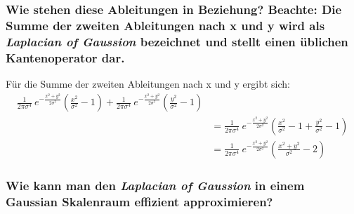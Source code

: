 \subsubsection*{Wie stehen diese Ableitungen in Beziehung? Beachte: Die Summe der zweiten Ableitungen nach x und y wird als \emph{Laplacian of Gaussion} bezeichnet und stellt einen \"ublichen Kantenoperator dar.}
F\"ur die Summe der zweiten Ableitungen nach x und y ergibt sich:
\begin{align*}
\frac{1}{2 \pi \sigma^4}~e^{-\frac{x^2 + y^2}{2 \sigma^2}} (\frac{x^2}{\sigma^2} - 1) + \frac{1}{2 \pi \sigma^4}~e^{-\frac{x^2 + y^2}{2 \sigma^2}} (\frac{y^2}{\sigma^2} - 1)\\
&= \frac{1}{2 \pi \sigma^4}~e^{-\frac{x^2 + y^2}{2 \sigma^2}} (\frac{x^2}{\sigma^2} - 1 + \frac{y^2}{\sigma^2} - 1)\\
&= \frac{1}{2 \pi \sigma^4}~e^{-\frac{x^2 + y^2}{2 \sigma^2}} (\frac{x^2 + y^2}{\sigma^2} - 2)
\end{align*}
\subsubsection*{Wie kann man den \emph{Laplacian of Gaussion} in einem Gaussian Skalenraum effizient approximieren?}
